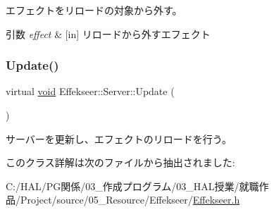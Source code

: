 エフェクトをリロードの対象から外す。 


\begin{DoxyParams}{引数}
{\em effect} & \mbox{[}in\mbox{]} リロードから外すエフェクト \\
\hline
\end{DoxyParams}
\mbox{\label{class_effekseer_1_1_server_af841f04fb41ed36b888cb2f89c4c0771}} 
\subsubsection{\texorpdfstring{Update()}{Update()}}
{\footnotesize\ttfamily virtual \mbox{\hyperlink{namespace_effekseer_ab34c4088e512200cf4c2716f168deb56}{void}} Effekseer\+::\+Server\+::\+Update (\begin{DoxyParamCaption}{ }\end{DoxyParamCaption})\hspace{0.3cm}{\ttfamily [pure virtual]}}



サーバーを更新し、エフェクトのリロードを行う。 



このクラス詳解は次のファイルから抽出されました\+:\begin{DoxyCompactItemize}
\item 
C\+:/\+H\+A\+L/\+P\+G関係/03\+\_\+作成プログラム/03\+\_\+\+H\+A\+L授業/就職作品/\+Project/source/05\+\_\+\+Resource/\+Effekseer/\mbox{\hyperlink{_effekseer_8h}{Effekseer.\+h}}\end{DoxyCompactItemize}
